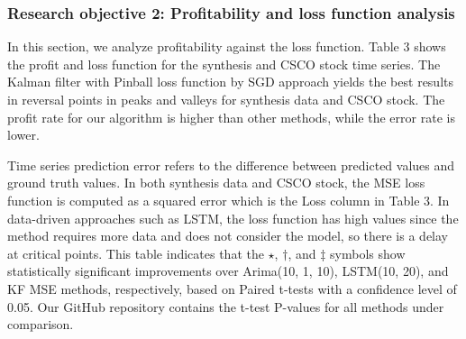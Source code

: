 \documentclass[12pt,a4paper]{article}
\begin{document}
	\subsubsection{Research objective 2: Profitability and loss function analysis}
	
	In this section, we analyze profitability against the loss function. Table 3 shows the profit and loss function for the synthesis and CSCO stock time series. The Kalman filter with Pinball loss function by SGD approach yields the best results in reversal points in peaks and valleys for synthesis data and CSCO stock. The profit rate for our algorithm is higher than other methods, while the error rate is lower.
	
	Time series prediction error refers to the difference between predicted values and ground truth values. In both synthesis data and CSCO stock, the MSE loss function is computed as a squared error which is the Loss column in Table 3. In data-driven approaches such as LSTM, the loss function has high values since the method requires more data and does not consider the model, so there is a delay at critical points. This table indicates that the \(\star\), \(\dagger\), and \(\ddagger\) symbols show statistically significant improvements over Arima(10, 1, 10), LSTM(10, 20), and KF MSE methods, respectively, based on Paired t-tests with a confidence level of 0.05. Our GitHub repository contains the t-test P-values for all methods under comparison.
	
\end{document}
